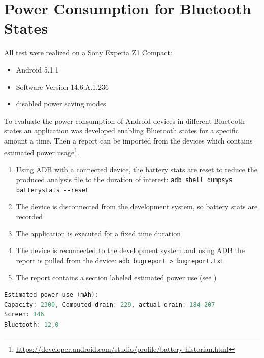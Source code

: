 
\section{Power Consumption for Bluetooth States} \label{Power Consumption for Bluetooth States}

All test were realized on a Sony Experia Z1 Compact:
\begin{itemize}
	\item Android 5.1.1
	\item Software Version 14.6.A.1.236
	\item disabled power saving modes
\end{itemize} 

To evaluate the power consumption of Android devices in different Bluetooth states an application was developed enabling Bluetooth states for a specific amount a time. Then a report can be imported from the devices which contains estimated power usage\footnote{\url{https://developer.android.com/studio/profile/battery-historian.html}}.

\begin{enumerate}
	\item Using \gls{ADB} with a connected device, the battery stats are reset to reduce the produced analysis file to the duration of interest: \lstinline|adb shell dumpsys batterystats --reset|
	\item The device is disconnected from the development system, so battery stats are recorded
	\item The application is executed for a fixed time duration
	\item The device is reconnected to the development system and using \gls{ADB} the report is pulled from the device: \lstinline|adb bugreport > bugreport.txt|
	\item The report contains a section labeled estimated power use (see )
\end{enumerate}
  
\begin{lstlisting}[language=C, caption={Android battery stats report}, label={Android battery stats report}]
Estimated power use (mAh):
Capacity: 2300, Computed drain: 229, actual drain: 184-207
Screen: 146
Bluetooth: 12,0
\end{lstlisting}
  
